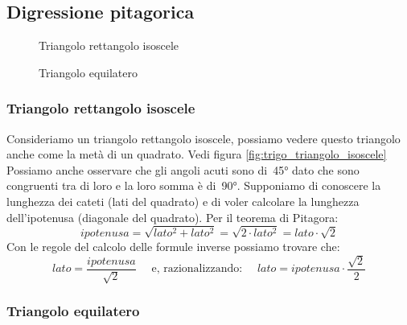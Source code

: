 \subsection{Digressione pitagorica}

 \begin{figure}[!h]
 \begin{minipage}[t]{.45\textwidth}
\begin{inaccessibleblock}
\centering
 
 \caption{Triangolo rettangolo isoscele}
 \label{fig:trigo_triangolo_isoscele}
\end{inaccessibleblock}
 \end{minipage}
 \begin{minipage}[t]{.45\textwidth}
\begin{inaccessibleblock}
\centering
 
 \caption{Triangolo equilatero}
 \label{fig:trigo_equilatero}
\end{inaccessibleblock}
 \end{minipage}
\end{figure}
\vspace{-24pt}

\subsubsection{Triangolo rettangolo isoscele}

Consideriamo un triangolo rettangolo isoscele, possiamo vedere questo 
triangolo anche come la metà di un quadrato. 
Vedi figura \ref{fig:trigo_triangolo_isoscele}
Possiamo anche osservare che gli angoli acuti sono di~45° dato che sono 
congruenti tra di loro e la loro somma è di~90°.
Supponiamo di conoscere la lunghezza dei cateti (lati del quadrato) e di voler 
calcolare la lunghezza dell'ipotenusa (diagonale del quadrato).
Per il teorema di Pitagora:
\[ipotenusa = \sqrt{lato^2 +lato^2} = 
              \sqrt{2 \cdot lato^2} = lato \cdot \sqrt{2}\]
Con le regole del calcolo delle formule inverse possiamo trovare che:
\[lato = \frac{ipotenusa}{\sqrt{2}} \quad \text{ e, razionalizzando: } \quad 
  lato = ipotenusa \cdot \frac{\sqrt{2}}{2}\]
\subsubsection{Triangolo equilatero}

